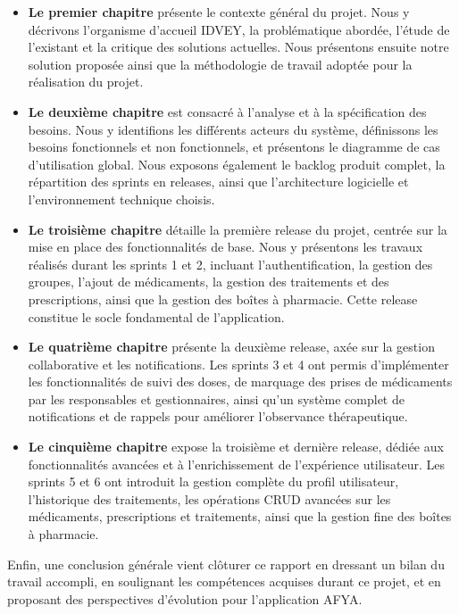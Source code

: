\begin{itemize}
    \item \textbf{Le premier chapitre} présente le contexte général du projet. Nous y décrivons l'organisme d'accueil IDVEY, la problématique abordée, l'étude de l'existant et la critique des solutions actuelles. Nous présentons ensuite notre solution proposée ainsi que la méthodologie de travail adoptée pour la réalisation du projet.

    \item \textbf{Le deuxième chapitre} est consacré à l'analyse et à la spécification des besoins. Nous y identifions les différents acteurs du système, définissons les besoins fonctionnels et non fonctionnels, et présentons le diagramme de cas d'utilisation global. Nous exposons également le backlog produit complet, la répartition des sprints en releases, ainsi que l'architecture logicielle et l'environnement technique choisis.

    \item \textbf{Le troisième chapitre} détaille la première release du projet, centrée sur la mise en place des fonctionnalités de base. Nous y présentons les travaux réalisés durant les sprints 1 et 2, incluant l'authentification, la gestion des groupes, l'ajout de médicaments, la gestion des traitements et des prescriptions, ainsi que la gestion des boîtes à pharmacie. Cette release constitue le socle fondamental de l'application.

    \item \textbf{Le quatrième chapitre} présente la deuxième release, axée sur la gestion collaborative et les notifications. Les sprints 3 et 4 ont permis d'implémenter les fonctionnalités de suivi des doses, de marquage des prises de médicaments par les responsables et gestionnaires, ainsi qu'un système complet de notifications et de rappels pour améliorer l'observance thérapeutique.

    \item \textbf{Le cinquième chapitre} expose la troisième et dernière release, dédiée aux fonctionnalités avancées et à l'enrichissement de l'expérience utilisateur. Les sprints 5 et 6 ont introduit la gestion complète du profil utilisateur, l'historique des traitements, les opérations CRUD avancées sur les médicaments, prescriptions et traitements, ainsi que la gestion fine des boîtes à pharmacie.
\end{itemize}

Enfin, une conclusion générale vient clôturer ce rapport en dressant un bilan du travail accompli, en soulignant les compétences acquises durant ce projet, et en proposant des perspectives d'évolution pour l'application AFYA.

\vspace{0.5cm}
